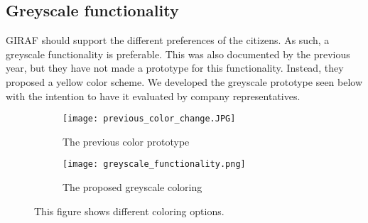 \subsection{Greyscale functionality}
GIRAF should support the different preferences of the citizens. As such, a greyscale functionality is preferable.
This was also documented by the previous year, but they have not made a prototype for this functionality.
Instead, they proposed a yellow color scheme.
We developed the greyscale prototype seen below with the intention to have it evaluated by company representatives.
\begin{figure}[H]
    \begin{subfigure}{0.5\textwidth}
    \texttt{[image: previous\_color\_change.JPG]} 
    \caption{The previous color prototype}
    \label{fig:previous_citizen_select}
    \end{subfigure}
    \begin{subfigure}{0.5\textwidth}
        \texttt{[image: greyscale\_functionality.png]}
    \caption{The proposed greyscale coloring}
    \label{fig:new_citizen_select}
    \end{subfigure} 
    \caption{This figure shows different coloring options.}
    \label{fig:citizen_select}
\end{figure}

